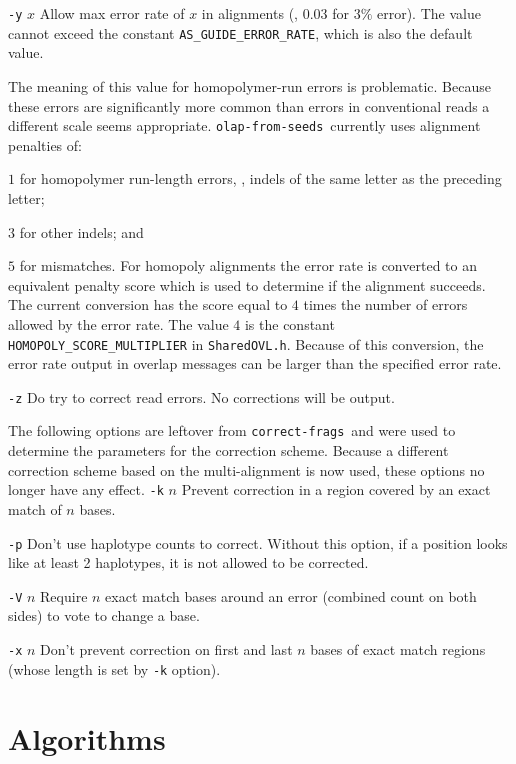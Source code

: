 \documentclass[letterpaper,11pt]{article}
\def\Pgm#1{\texttt{#1}}
\def\correctfrags{\Pgm{correct-frags}}
\def\ofs{\Pgm{olap-from-seeds}}
\newenvironment{technotes}{\bq\small\bf\bi\exdent{Technical Notes:}}{\ei\eq}
\def\btn{\begin{technotes}}
\def\etn{\end{technotes}}
\begin{document}
\exdent
  \Pgm{-y} $x$ \quad
  Allow max error rate of $x$ in alignments (\eg, $0.03$ for $3\%$ error).
  The value cannot exceed the constant \verb`AS_GUIDE_ERROR_RATE`, which
  is also the default value.
  \btn
  \item
    The meaning of this value for homopolymer-run errors is problematic.
    Because these errors are significantly more common than errors in
    conventional reads a different scale seems appropriate.  \ofs\ currently
    uses alignment penalties of:
    \bi
    \item
      $1$ for homopolymer run-length errors, \ie, indels of the same letter
      as the preceding letter;
    \item
      $3$ for other indels; and
    \item
      $5$ for mismatches.
    \ei
    For homopoly alignments the error rate is converted to an equivalent
    penalty score which is used to determine if the alignment succeeds.
    The current conversion has the score equal to $4$ times the number
    of errors allowed by the error rate.  The value $4$ is the
    constant \verb`HOMOPOLY_SCORE_MULTIPLIER` in \Pgm{SharedOVL.h}.
    Because of this conversion, the error rate output in overlap messages
    can be larger than the specified error rate.
  \etn

\exdent
  \Pgm{-z} \quad
  Do  try to correct read errors.  No corrections will be output.
\ei

The following options are leftover from \correctfrags\ and were
used to determine the parameters for the correction scheme.  Because a
different correction scheme based on the multi-alignment is now used,
these options no longer have any effect.
\bi
\exdent
  \Pgm{-k} $n$ \quad
  Prevent correction in a region covered by an exact match of $n$ bases.

\exdent
  \Pgm{-p} \quad
  Don't use haplotype counts to correct.  Without this option, if
  a position looks like at least 2 haplotypes, it is not allowed
  to be corrected.

\exdent
  \Pgm{-V} $n$ \quad
  Require $n$ exact match bases around an error (combined count
  on both sides) to vote to change a base.

\exdent
  \Pgm{-x} $n$ \quad
  Don't prevent correction on first and last $n$ bases of exact match
  regions (whose length is set by \Pgm{-k} option).
\ei

\section{Algorithms}
\end{document}
